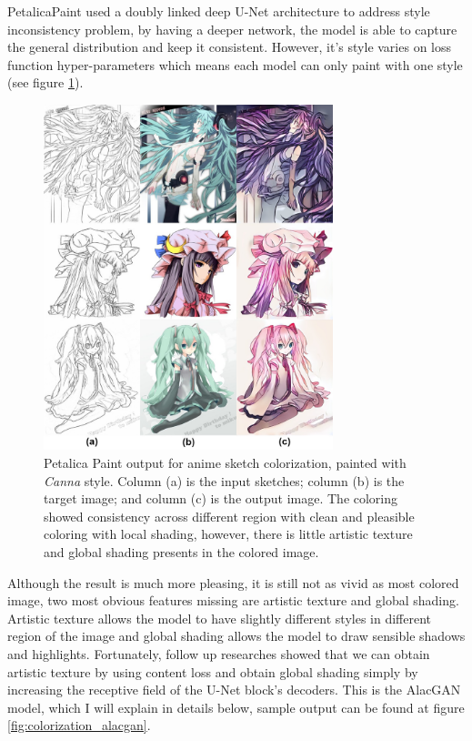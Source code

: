 PetalicaPaint\cite{PetalicaPaint} used a doubly linked deep U-Net architecture to address style inconsistency problem, by having a deeper network, the model is able to capture the general distribution and keep it consistent. However, it's style varies on loss function hyper-parameters which means each model can only paint with one style (see figure \ref{fig:colorization_petalica}).


\begin{figure}
    \centering
    \includegraphics[width=0.75\textwidth]{images/colorization/petalica.jpg}
    \caption{Petalica Paint output for anime sketch colorization, painted with \textit{Canna\protect\footnotemark}  style. Column (a) is the input sketches; column (b) is the target image; and column (c) is the output image.\cite{steinsDeepLearningProject2022} The coloring showed consistency across different region with clean and pleasible coloring with local shading, however, there is little artistic texture and global shading presents in the colored image.} 
    \label{fig:colorization_petalica}
\end{figure}


Although the result is much more pleasing, it is still not as vivid as most colored image, two most obvious features missing are artistic texture and global shading. Artistic texture allows the model to have slightly different styles in different region of the image and global shading allows the model to draw sensible shadows and highlights. Fortunately, follow up researches showed that we can obtain artistic texture by using content loss and obtain global shading simply by increasing the receptive field of the U-Net block's decoders\cite{ciUserGuidedDeepAnime2018}. This is the AlacGAN model, which I will explain in details below, sample output can be found at figure \ref{fig:colorization_alacgan}.

